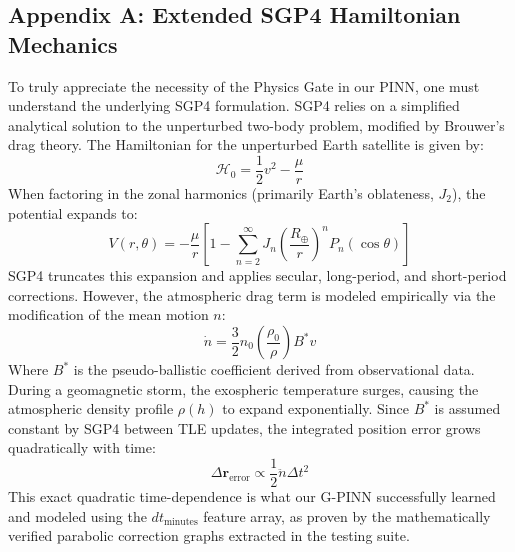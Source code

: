 \documentclass[twocolumn]{article}
\begin{document}
\subsection*{Appendix A: Extended SGP4 Hamiltonian Mechanics}
To truly appreciate the necessity of the Physics Gate in our PINN, one must understand the underlying SGP4 formulation. SGP4 relies on a simplified analytical solution to the unperturbed two-body problem, modified by Brouwer's drag theory. The Hamiltonian for the unperturbed Earth satellite is given by:
\begin{equation}
    \mathcal{H}_0 = \frac{1}{2}v^2 - \frac{\mu}{r}
\end{equation}
When factoring in the zonal harmonics (primarily Earth's oblateness, $J_2$), the potential expands to:
\begin{equation}
    V(r, \theta) = -\frac{\mu}{r} \left[ 1 - \sum_{n=2}^{\infty} J_n \left(\frac{R_\oplus}{r}\right)^n P_n(\cos \theta) \right]
\end{equation}
SGP4 truncates this expansion and applies secular, long-period, and short-period corrections. However, the atmospheric drag term is modeled empirically via the modification of the mean motion $n$:
\begin{equation}
    \dot{n} = \frac{3}{2} n_0 \left( \frac{\rho_0}{\rho} \right) B^* v
\end{equation}
Where $B^*$ is the pseudo-ballistic coefficient derived from observational data. During a geomagnetic storm, the exospheric temperature surges, causing the atmospheric density profile $\rho(h)$ to expand exponentially. Since $B^*$ is assumed constant by SGP4 between TLE updates, the integrated position error grows quadratically with time:
\begin{equation}
    \Delta \mathbf{r}_{\text{error}} \propto \frac{1}{2} \ddot{n} \Delta t^2
\end{equation}
This exact quadratic time-dependence is what our G-PINN successfully learned and modeled using the $dt_{\text{minutes}}$ feature array, as proven by the mathematically verified parabolic correction graphs extracted in the testing suite.


\end{document}

